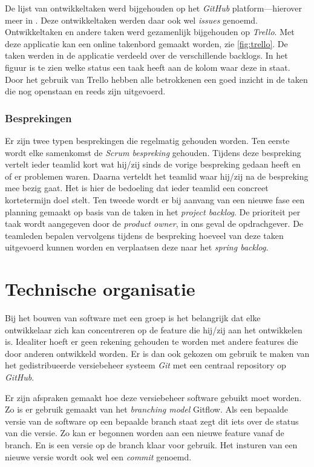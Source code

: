 De lijst van ontwikkeltaken werd bijgehouden op het \emph{GitHub} platform—hierover meer in . Deze ontwikkeltaken werden daar ook wel \emph{issues} genoemd. Ontwikkeltaken en andere taken werd gezamenlijk bijgehouden op \emph{Trello}. Met deze applicatie kan een online takenbord gemaakt worden, zie \autoref{fig:trello}. De taken werden in de applicatie verdeeld over de verschillende backlogs. In het figuur is te zien welke status een taak heeft aan de kolom waar deze in staat. Door het gebruik van Trello hebben alle betrokkenen een goed inzicht in de taken die nog openstaan en reeds zijn uitgevoerd.

\subsubsection{Besprekingen}
Er zijn twee typen besprekingen die regelmatig gehouden worden. Ten eerste wordt elke samenkomst de \emph{Scrum bespreking} gehouden. Tijdens deze bespreking vertelt ieder teamlid kort wat hij/zij sinds de vorige bespreking gedaan heeft en of er problemen waren. Daarna verteldt het teamlid waar hij/zij na de bespreking mee bezig gaat. Het is hier de bedoeling dat ieder teamlid een concreet kortetermijn doel stelt.
Ten tweede wordt er bij aanvang van een nieuwe fase een planning gemaakt op basis van de taken in het \emph{project backlog}. De prioriteit per taak wordt aangegeven door de \emph{product owner}, in ons geval de opdrachgever. De teamleden bepalen vervolgens tijdens de bespreking hoeveel van deze taken uitgevoerd kunnen worden en verplaatsen deze naar het \emph{spring backlog}. 

\section{Technische organisatie} \label{sec:technische_organisatie}
Bij het bouwen van software met een groep is het belangrijk dat elke ontwikkelaar zich kan concentreren op de feature die hij/zij aan het ontwikkelen is. Idealiter hoeft er geen rekening gehouden te worden met andere features die door anderen ontwikkeld worden. Er is dan ook gekozen om gebruik te maken van het gedistribueerde versiebeheer systeem \emph{Git} met een centraal repository op \emph{GitHub}.

Er zijn afspraken gemaakt hoe deze versiebeheer software gebuikt moet worden. Zo is er gebruik gemaakt van het \emph{branching model} Gitflow\cite{Gitflow2010}. Als een bepaalde versie van de software op een bepaalde branch staat zegt dit iets over de status van die versie. Zo kan er begonnen worden aan een nieuwe feature vanaf de  branch. En is een versie op de  branch klaar voor gebruik. Het insturen van een nieuwe versie wordt ook wel een \emph{commit} genoemd.

